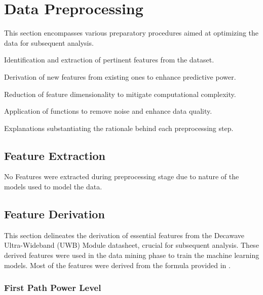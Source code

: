 \section{Data Preprocessing}\label{data_preprocessing}

This section encompasses various preparatory procedures aimed at optimizing the data for subsequent analysis.

\begin{description}[style=nextline]
    \item[Feature Extraction:] Identification and extraction of pertinent features from the dataset.
    \item[Feature Derivation:] Derivation of new features from existing ones to enhance predictive power.
    \item[Feature Reduction:] Reduction of feature dimensionality to mitigate computational complexity.
    \item[De-Noise Functions:] Application of functions to remove noise and enhance data quality.
    \item[Justifications of Processes:] Explanations substantiating the rationale behind each preprocessing step.
\end{description}

\subsection{Feature Extraction}\label{feature_extraction}

No Features were extracted during preprocessing stage due to nature of the models used to model the data.


\subsection{Feature Derivation}\label{feature_derivation}

This section delineates the derivation of essential features from the Decawave Ultra-Wideband (UWB) Module datasheet, crucial for subsequent analysis. These derived features were used in the data mining phase to train the machine learning models. Most of the features were derived from the formula provided in \cite{DecawaveDW1000}.

\subsubsection{First Path Power Level}\label{first_path_power_level}

